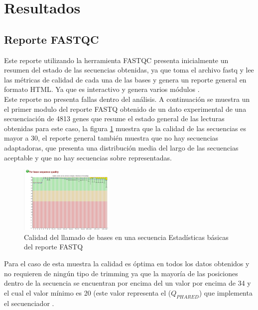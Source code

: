 {\section{Resultados}
	\subsection*{Reporte FASTQC}}

Este reporte utilizando la herramienta FASTQC presenta inicialmente un resumen del estado de las secuencias obtenidas, ya que toma el archivo fastq y lee las métricas de calidad de cada una de las bases y genera un reporte general en formato HTML. Ya que es interactivo y genera varios módulos \cite{Babraham2016}. \\

Este reporte no presenta fallas dentro del análisis. A continuación se muestra un el primer modulo del reporte FASTQ obtenido de un dato experimental de una secuenciación de 4813 genes que resume el estado general de las lecturas obtenidas para este caso, la figura \ref{fig:fastq2} muestra que la calidad de las secuencias es mayor a 30, el reporte general también muestra que no hay secuencias adaptadoras, que presenta una distribución media del largo de las secuencias aceptable y que no hay secuencias sobre representadas.  \\

\begin{figure}[H]
	\centering
	\includegraphics[width=0.4\textwidth]{Kap2/fastq2}
	\caption{Calidad del llamado de bases en una secuencia Estadísticas básicas del reporte FASTQ} \label{fig:fastq2}
\end{figure}

Para el caso de esta muestra la calidad es óptima en todos los datos obtenidos y no requieren de ningún tipo de trimming ya que la mayoría de las posiciones dentro de la secuencia se encuentran por encima del un valor por encima de 34 y el cual el valor mínimo es 20 (este valor representa el ($Q_{PHARED}$) que implementa el secuenciador \cite{Babraham2016}. \\ 

